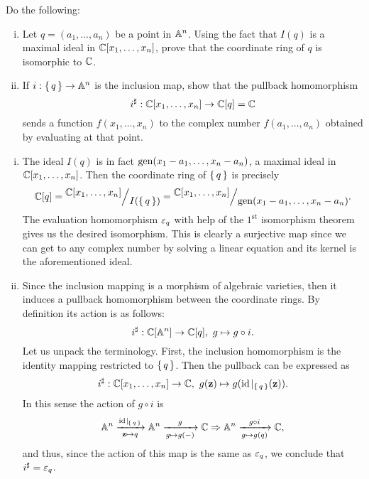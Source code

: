 \documentclass[12pt]{memoir}
\begin{document}
\begin{Ej}
  Do the following:
  \begin{enumerate}[i)]
    \itemsep=-0.4em 
    \item Let $q=(a_1,\dots,a_n)$ be a point in $\mathbb{A}^n$. Using the fact that $I(q)$ is a maximal ideal in $\mathbb{C}[x_1,\dots,x_n]$, prove that the coordinate ring of $q$ is isomorphic to $\mathbb{C}$.
    \item If $i:\{\,q\,\}\to\mathbb{A}^n$ is the inclusion map, show that the pullback homomorphism
    $$i^\sharp : \mathbb{C}[x_1,\dots,x_n] \to \mathbb{C}[q] = \mathbb{C}$$
    sends a function $f (x_1,\dots,x_n)$ to the complex number $f (a_1,\dots,a_n)$ obtained by evaluating at that point.
  \end{enumerate}
   
\end{Ej}

\begin{ptcbr}
  \begin{enumerate}[i)]
    \itemsep=-0.4em 
  \item The ideal $I(q)$ is in fact $\operatorname{gen}(x_1-a_1,\dots,x_n-a_n)$, a maximal ideal in $\mathbb{C}[x_1,\dots,x_n]$. Then the coordinate ring of $\{\,q\,\}$ is precisely
  $$\bC[q]=\quot{\bC[x_1,\dots,x_n]}{I(\set{q})}=\quot{\bC[x_1,\dots,x_n]}{\gen(x_1-a_1,\dots,x_n-a_n)}.$$
  The evaluation homomorphism $\varepsilon_{q}$ with help of the $1^{\text{{st}}}$ isomorphism theorem gives us the desired isomorphism. This is clearly a surjective map since we can get to any complex number by solving a linear equation and its kernel is the aforementioned ideal.
  \item Since the inclusion mapping is a morphism of algebraic varieties, then it induces a pullback homomorphism between the coordinate rings. By definition its action is as follows:
  $$i^\sharp:\mathbb{C}[\mathbb{A}^n]\to\mathbb{C}[q],\ g\mapsto g\circ i.$$
  Let us unpack the terminology. First, the inclusion homomorphism is the identity mapping restricted to $\{\,q\,\}$. Then the pullback can be expressed as 
  $$i^\3:\bC[x_1,\dots,x_n]\to\bC,\ g(\vec{z})\mapsto g(\id\hspace{-0.3em}\mid\hspace{-0.3em}_{\set{q}}(\vec{z})).$$
  In this sense the action of $g\circ i$ is 
  $$\bA^n\xrightarrow[\vec{z}\mapsto q]{\id\hspace{-0.3em}\mid\hspace{-0.3em}_{\set{q}}}\bA^n\xrightarrow[g\mapsto g(-)]{g}\bC\To\bA^n\xrightarrow[g\mapsto g(q)]{g\circ i}\bC,$$
  and thus, since the action of this map is the same as $\varepsilon_q$, we conclude that $i^\sharp=\varepsilon_q$.
  \end{enumerate}
\end{ptcbr}
\end{document}
